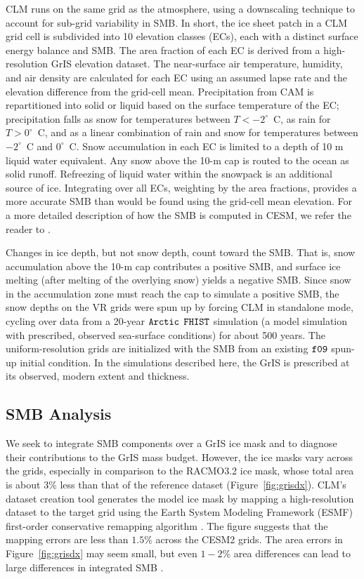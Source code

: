 \documentclass[draft]{agujournal2019}
\begin{document}
CLM runs on the same grid as the atmosphere, using a downscaling technique to account for sub-grid variability in SMB. In short, the ice sheet patch in a CLM grid cell is subdivided into 10 elevation classes (ECs), each with a distinct surface energy balance and SMB. The area fraction of each EC is derived from a high-resolution GrIS elevation dataset. The near-surface air temperature, humidity, and air density are calculated for each EC using an assumed lapse rate and the elevation difference from the grid-cell mean. Precipitation from CAM is repartitioned into solid or liquid based on the surface temperature of the EC; precipitation falls as snow for temperatures between $T < -2^\circ$~C, as rain for $T > 0^\circ$~C,  and as a linear combination of rain and snow for temperatures between $-2^\circ$~C and $0^\circ$~C.
Snow accumulation in each EC is limited to a depth of 10 m liquid water equivalent. Any snow above the 10-m cap is routed to the ocean as solid runoff.  Refreezing of liquid water within the snowpack is an additional source of ice.  Integrating over all ECs, weighting by the area fractions, provides a more accurate SMB than would be found using the grid-cell mean elevation. For a more detailed description of how the SMB is computed in CESM, we refer the reader to .

Changes in ice depth, but not snow depth, count toward the SMB.  That is, snow accumulation above the 10-m cap contributes a positive SMB, and surface ice melting (after melting of the overlying snow) yields a negative SMB.  Since snow in the accumulation zone must reach the cap to simulate a positive SMB, the snow depths on the VR grids were spun up by forcing CLM in standalone mode, cycling over data from a 20-year $\tt Arctic$ $\tt FHIST$ simulation (a model simulation with prescribed, observed sea-surface conditions) for about 500 years. The uniform-resolution grids are initialized with the SMB from an existing $\tt f09$ spun-up initial condition. In the simulations described here, the GrIS is prescribed at its observed, modern extent and thickness.

\subsection{SMB Analysis}\label{sec:SMB}

We seek to integrate SMB components over a GrIS ice mask and to diagnose their contributions to the GrIS mass budget. However, the ice masks vary across the grids, especially in comparison to the RACMO3.2 ice mask, whose total area is about $3\%$ less than that of the reference dataset (Figure~\ref{fig:grisdx}). CLM's dataset creation tool generates the model ice mask by mapping a high-resolution dataset to the target grid using the Earth System Modeling Framework (ESMF) first-order conservative remapping algorithm \cite{ESMF}. The figure suggests that the mapping errors are less than $1.5\%$ across the CESM2 grids. The area errors in Figure~\ref{fig:grisdx} may  seem small, but even $1-2\%$ area differences can lead to large differences in integrated SMB \cite{HETAL2022TC}. 
\end{document}
